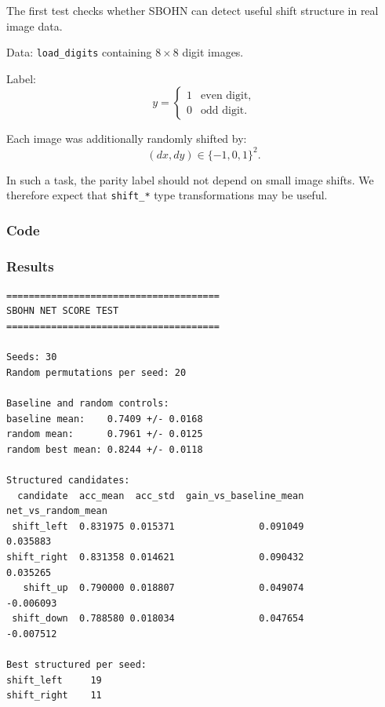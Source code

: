 \documentclass[11pt,a4paper]{report}
\begin{document}
The first test checks whether SBOHN can detect useful shift structure in real image data.

Data: \texttt{load\_digits} containing $8\times 8$ digit images.

Label:
\[
y=
\begin{cases}
1 & \text{even digit},\\
0 & \text{odd digit}.
\end{cases}
\]

Each image was additionally randomly shifted by:
\[
(dx,dy)\in\{-1,0,1\}^2.
\]

In such a task, the parity label should not depend on small image shifts. We therefore expect that \texttt{shift\_*} type transformations may be useful.

\subsubsection{Code}

\noindent{}


\subsubsection{Results}

\begin{verbatim}
======================================
SBOHN NET SCORE TEST
======================================

Seeds: 30
Random permutations per seed: 20

Baseline and random controls:
baseline mean:    0.7409 +/- 0.0168
random mean:      0.7961 +/- 0.0125
random best mean: 0.8244 +/- 0.0118

Structured candidates:
  candidate  acc_mean  acc_std  gain_vs_baseline_mean  net_vs_random_mean
 shift_left  0.831975 0.015371               0.091049            0.035883
shift_right  0.831358 0.014621               0.090432            0.035265
   shift_up  0.790000 0.018807               0.049074           -0.006093
 shift_down  0.788580 0.018034               0.047654           -0.007512

Best structured per seed:
shift_left     19
shift_right    11
\end{verbatim}
\end{document}
